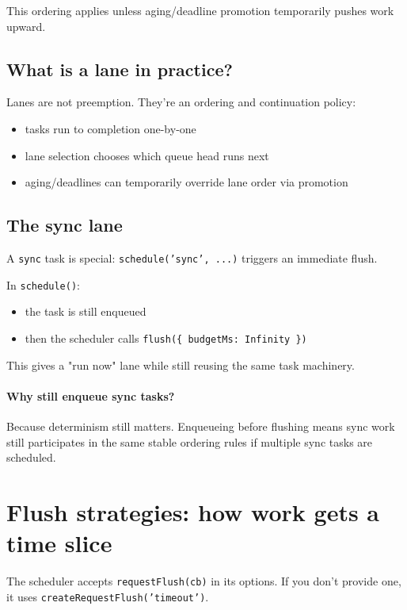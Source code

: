This ordering applies unless aging/deadline promotion temporarily pushes work upward.

\subsection{What is a lane in practice?}

Lanes are not preemption.
They’re an ordering and continuation policy:

\begin{itemize}
  \item tasks run to completion one-by-one
  \item lane selection chooses which queue head runs next
  \item aging/deadlines can temporarily override lane order via promotion
\end{itemize}

\subsection{The sync lane}

A \texttt{sync} task is special: \texttt{schedule('sync', ...)} triggers an immediate flush.

In \texttt{schedule()}:

\begin{itemize}
  \item the task is still enqueued
  \item then the scheduler calls \texttt{flush(\{ budgetMs: Infinity \})}
\end{itemize}

This gives a "run now" lane while still reusing the same task machinery.

\paragraph{Why still enqueue sync tasks?}

Because determinism still matters.
Enqueueing before flushing means sync work still participates in the same stable ordering rules if multiple sync tasks are scheduled.

\section{Flush strategies: how work gets a time slice}

The scheduler accepts \texttt{requestFlush(cb)} in its options.
If you don't provide one, it uses \texttt{createRequestFlush('timeout')}.

